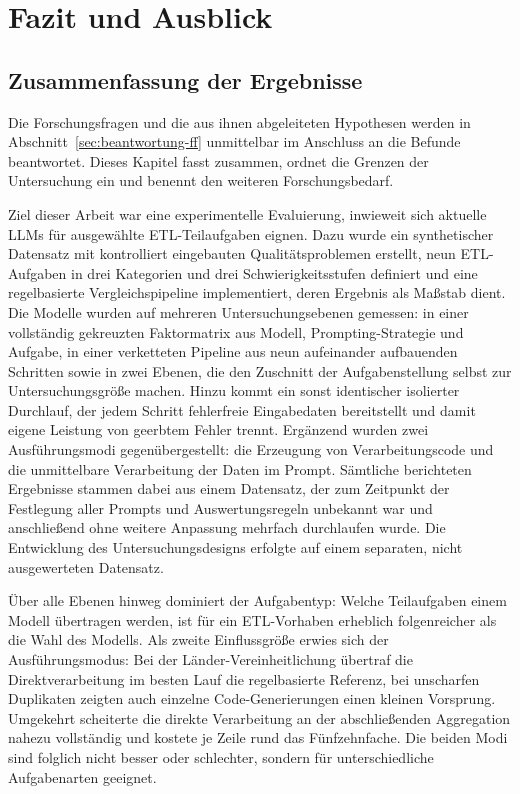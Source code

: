 ﻿%

\newpage
\chapter{Fazit und Ausblick}
\label{ch:fazit}

\section{Zusammenfassung der Ergebnisse}
\label{sec:zusammenfassung}

Die Forschungsfragen und die aus ihnen abgeleiteten Hypothesen werden in Abschnitt~\ref{sec:beantwortung-ff} unmittelbar im Anschluss an die Befunde beantwortet. Dieses Kapitel fasst zusammen, ordnet die Grenzen der Untersuchung ein und benennt den weiteren Forschungsbedarf.

Ziel dieser Arbeit war eine experimentelle Evaluierung, inwieweit sich aktuelle \acp{LLM} für ausgewählte \ac{ETL}-Teilaufgaben eignen. Dazu wurde ein synthetischer Datensatz mit kontrolliert eingebauten Qualitätsproblemen erstellt, neun \ac{ETL}-Aufgaben in drei Kategorien und drei Schwierigkeitsstufen definiert und eine regelbasierte Vergleichspipeline implementiert, deren Ergebnis als Maßstab dient. Die Modelle wurden auf mehreren Untersuchungsebenen gemessen: in einer vollständig gekreuzten Faktormatrix aus Modell, Prompting-Strategie und Aufgabe, in einer verketteten Pipeline aus neun aufeinander aufbauenden Schritten sowie in zwei Ebenen, die den Zuschnitt der Aufgabenstellung selbst zur Untersuchungsgröße machen. Hinzu kommt ein sonst identischer isolierter Durchlauf, der jedem Schritt fehlerfreie Eingabedaten bereitstellt und damit eigene Leistung von geerbtem Fehler trennt. Ergänzend wurden zwei Ausführungsmodi gegenübergestellt: die Erzeugung von Verarbeitungscode und die unmittelbare Verarbeitung der Daten im Prompt. Sämtliche berichteten Ergebnisse stammen dabei aus einem Datensatz, der zum Zeitpunkt der Festlegung aller Prompts und Auswertungsregeln unbekannt war und anschließend ohne weitere Anpassung mehrfach durchlaufen wurde. Die Entwicklung des Untersuchungsdesigns erfolgte auf einem separaten, nicht ausgewerteten Datensatz.

Über alle Ebenen hinweg dominiert der Aufgabentyp: Welche Teilaufgaben einem Modell übertragen werden, ist für ein \ac{ETL}-Vorhaben erheblich folgenreicher als die Wahl des Modells. Als zweite Einflussgröße erwies sich der Ausführungsmodus: Bei der Länder-Vereinheitlichung übertraf die Direktverarbeitung im besten Lauf die regelbasierte Referenz, bei unscharfen Duplikaten zeigten auch einzelne Code-Generierungen einen kleinen Vorsprung. Umgekehrt scheiterte die direkte Verarbeitung an der abschließenden Aggregation nahezu vollständig und kostete je Zeile rund das Fünfzehnfache. Die beiden Modi sind folglich nicht besser oder schlechter, sondern für unterschiedliche Aufgabenarten geeignet.

